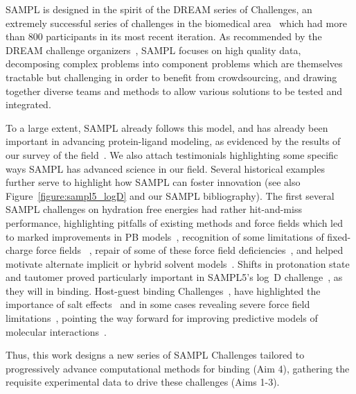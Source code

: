 \documentclass[11pt]{article}
\begin{document}
SAMPL is designed in the spirit of the DREAM series of Challenges, an extremely successful series of challenges in the biomedical area~\cite{Prill:2011:Sci.Signal., Eisenstein:2013:NatBiotech, Saez-Rodriguez:2016:NatRevGenet} which had more than 800 participants in its most recent iteration. 
As recommended by the DREAM challenge organizers~\cite{Saez-Rodriguez:2016:NatRevGenet}, SAMPL focuses on high quality data, decomposing complex problems into component problems which are themselves tractable but challenging in order to benefit from crowdsourcing, and drawing together diverse teams and methods to allow various solutions to be tested and integrated.

To a large extent, SAMPL already follows this model, and has already been important in advancing protein-ligand modeling, as evidenced by the results of our survey of the field~\cite{Mobley:2017:eScholarship}.
We also attach testimonials highlighting some specific ways SAMPL has advanced science in our field.
Several historical examples further serve to highlight how SAMPL can foster innovation (see also Figure~\ref{figure:sampl5_logD} and our SAMPL bibliography). 
The first several SAMPL challenges on hydration free energies had rather hit-and-miss performance, highlighting pitfalls of existing methods and force fields which led to marked improvements in PB models~\cite{nicholls_samp1_2009, ellingson_analysis_2010,ellingson_efficient_2014}, recognition of some limitations of fixed-charge force fields ~\cite{mobley_alchemical_2012, Fennell:2014:J.Phys.Chem.B},
repair of some of these force field deficiencies~\cite{mobley_alchemical_2012, Fennell:2014:J.Phys.Chem.B, paranahewage_predicting_2016},
and helped motivate alternate implicit or hybrid solvent models~\cite{sulea_predicting_2011, li_testing_2014, brini_adapting_2016}.
Shifts in protonation state and tautomer proved particularly important in SAMPL5's log~D challenge~\cite{Bannan:2016:JComputAidedMolDes, klamt_prediction_2016}, as they will in binding.
Host-guest binding Challenges~\cite{mobley_predicting_2016},
have highlighted the importance of salt effects~\cite{yin_overview_2016, muddana_blind_2014, mobley_predicting_2016}
and in some cases revealing severe force field limitations~\cite{yin_sampl5_2016, muddana_sampl4_2014-1}, pointing the way forward for improving predictive models of molecular interactions~\cite{yin_toward_2015, mobley_predicting_2016}.

Thus, this work designs a new series of SAMPL Challenges tailored to progressively advance computational methods for binding (Aim 4), gathering the requisite experimental data to drive these challenges (Aims 1-3). 
\end{document}
